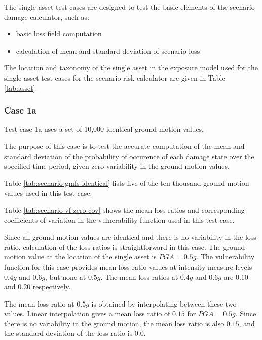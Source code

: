 The single asset test cases are designed to test the basic elements of the scenario damage calculator, such as:

\begin{itemize}
\item basic loss field computation
\item calculation of mean and standard deviation of scenario loss
\end{itemize}

The location and taxonomy of the single asset in the exposure model used for the single-asset test cases for the scenario risk calculator are given in Table \ref{tab:asset}.

\subsubsection{Case 1a}
Test case 1a uses a set of 10,000 identical ground motion values.

The purpose of this case is to test the accurate computation of the mean and standard deviation of the probability of occurence of each damage state over the specified time period, given zero variability in the ground motion values.



Table \ref{tab:scenario-gmfs-identical} lists five of the ten thousand ground motion values used in this test case.



Table \ref{tab:scenario-vf-zero-cov} shows the mean loss ratios and corresponding coefficients of variation in the vulnerability function used in this test case.

Since all ground motion values are identical and there is no variability in the loss ratio, calculation of the loss ratios is straightforward in this case. The ground motion value at the location of the single asset is $PGA = 0.5 g$. The vulnerability function for this case provides mean loss ratio values at intensity measure levels $0.4 g$ and $0.6 g$, but none at $0.5 g$. The mean loss ratios at $0.4 g$ and $0.6 g$ are $0.10$ and $0.20$ respectively.

The mean loss ratio at $0.5 g$ is obtained by interpolating between these two values. Linear interpolation gives a mean loss ratio of $0.15$ for $PGA = 0.5 g$. Since there is no variability in the ground motion, the mean loss ratio is also $0.15$, and the standard deviation of the loss ratio is $0.0$.

